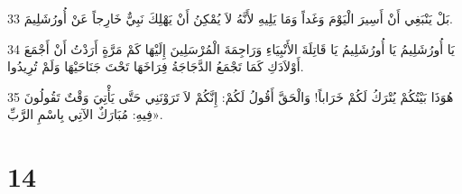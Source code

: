 \par 33 بَلْ يَنْبَغِي أَنْ أَسِيرَ الْيَوْمَ وَغَداً وَمَا يَلِيهِ لأَنَّهُ لاَ يُمْكِنُ أَنْ يَهْلِكَ نَبِيٌّ خَارِجاً عَنْ أُورُشَلِيمَ.
\par 34 يَا أُورُشَلِيمُ يَا أُورُشَلِيمُ يَا قَاتِلَةَ الأَنْبِيَاءِ وَرَاجِمَةَ الْمُرْسَلِينَ إِلَيْهَا كَمْ مَرَّةٍ أَرَدْتُ أَنْ أَجْمَعَ أَوْلاَدَكِ كَمَا تَجْمَعُ الدَّجَاجَةُ فِرَاخَهَا تَحْتَ جَنَاحَيْهَا وَلَمْ تُرِيدُوا.
\par 35 هُوَذَا بَيْتُكُمْ يُتْرَكُ لَكُمْ خَرَاباً! وَالْحَقَّ أَقُولُ لَكُمْ: إِنَّكُمْ لاَ تَرَوْنَنِي حَتَّى يَأْتِيَ وَقْتٌ تَقُولُونَ فِيهِ: مُبَارَكٌ الآتِي بِاسْمِ الرَّبِّ».

\chapter{14}

